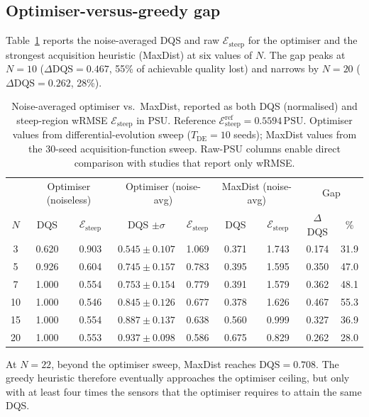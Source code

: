 \documentclass[11pt,letterpaper]{article}
\begin{document}
\subsection{Optimiser-versus-greedy gap}
Table~\ref{tab:gap} reports the noise-averaged DQS and raw
$\mathcal{E}_{\text{steep}}$ for the optimiser and the strongest
acquisition heuristic (MaxDist) at six values of $N$. The gap peaks at
$N=10$ ($\Delta\mathrm{DQS}=0.467$, 55\% of achievable quality lost)
and narrows by $N=20$ ($\Delta\mathrm{DQS}=0.262$, 28\%).

\begin{table}[H]
\centering
\caption{Noise-averaged optimiser vs.\ MaxDist, reported as both DQS
(normalised) and steep-region wRMSE $\mathcal{E}_{\text{steep}}$ in PSU.
Reference $\mathcal{E}_{\text{steep}}^{\text{ref}}=0.5594\,\mathrm{PSU}$.
Optimiser values from differential-evolution sweep
($T_{\mathrm{DE}}=10$ seeds); MaxDist values from the
30-seed acquisition-function sweep. Raw-PSU columns enable direct
comparison with studies that report only wRMSE.}
\label{tab:gap}
\small
\setlength{\tabcolsep}{4pt}
\begin{tabular}{@{}c|cc|cc|cc|cc@{}}
\toprule
   & \multicolumn{2}{c|}{Optimiser (noiseless)}
   & \multicolumn{2}{c|}{Optimiser (noise-avg)}
   & \multicolumn{2}{c|}{MaxDist (noise-avg)}
   & \multicolumn{2}{c}{Gap} \\
$N$ & DQS & $\mathcal{E}_{\text{steep}}$
    & DQS $\pm\sigma$ & $\mathcal{E}_{\text{steep}}$
    & DQS & $\mathcal{E}_{\text{steep}}$
    & $\Delta$DQS & \% \\
\midrule
3  & 0.620 & 0.903 & $0.545\pm0.107$ & 1.069 & 0.371 & 1.743 & 0.174 & 31.9 \\
5  & 0.926 & 0.604 & $0.745\pm0.157$ & 0.783 & 0.395 & 1.595 & 0.350 & 47.0 \\
7  & 1.000 & 0.554 & $0.753\pm0.154$ & 0.779 & 0.391 & 1.579 & 0.362 & 48.1 \\
10 & 1.000 & 0.546 & $0.845\pm0.126$ & 0.677 & 0.378 & 1.626 & 0.467 & 55.3 \\
15 & 1.000 & 0.554 & $0.887\pm0.137$ & 0.638 & 0.560 & 0.999 & 0.327 & 36.9 \\
20 & 1.000 & 0.553 & $0.937\pm0.098$ & 0.586 & 0.675 & 0.829 & 0.262 & 28.0 \\
\bottomrule
\end{tabular}
\end{table}

At $N=22$, beyond the optimiser sweep, MaxDist reaches
$\mathrm{DQS}=0.708$. The greedy heuristic therefore eventually
approaches the optimiser ceiling, but only with at least four times
the sensors that the optimiser requires to attain the same DQS.
\end{document}

